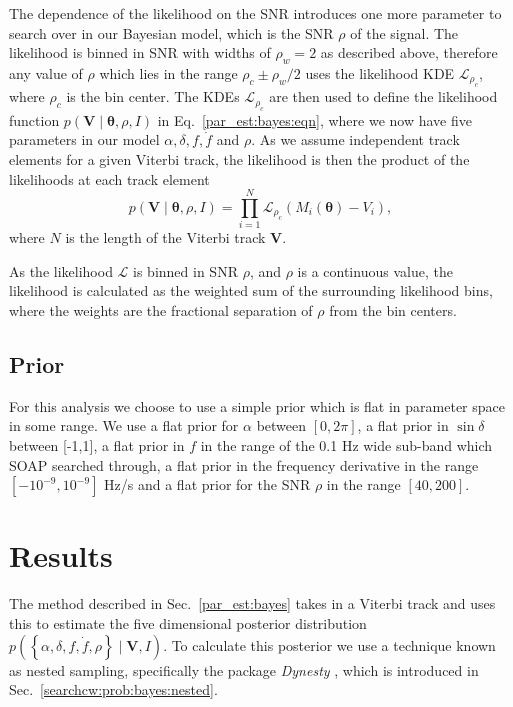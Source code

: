 The dependence of the likelihood on the \gls{SNR} introduces one more parameter to search over in our
Bayesian model, which is the \gls{SNR} $\rho$ of the signal.  The likelihood is binned in \gls{SNR} with widths of $\rho_w = 2$ as described above, therefore any value of $\rho$ which lies in the range $\rho_c \pm \rho_w/2 $ uses the likelihood \gls{KDE} $\mathcal{L}_{\rho_c}$, where $\rho_c$ is the bin center.
The \glspl{KDE} $\mathcal{L}_{\rho_c}$ are then used to define the likelihood function $p(\bm{V} \mid
\bm{\theta}, \rho, I)$ in Eq.~\ref{par_est:bayes:eqn}, where we now have five parameters in our model
$\alpha, \delta, f, \dot{f}$ and $\rho$.  As we assume
independent track elements for a given Viterbi track, the likelihood is then the product of the likelihoods at each track element
%
\begin{equation} 
p(\bm{V} \mid \bm{\theta}, \rho, I) = \prod_{i =
1}^{N} \mathcal{L}_{\rho_c}(M_i(\bm{\theta}) - V_i) , 
\end{equation} 
%
where $N$ is the length of the Viterbi track $\bm{V}$. 

\if
As the likelihood $\mathcal{L}$ is binned in \gls{SNR} $\rho$, and $\rho$ is a
continuous value, the likelihood is calculated as the weighted sum of the
surrounding likelihood bins, where the weights are the fractional separation of
$\rho$ from the bin centers.  
\fi

%
\subsection{Prior}
%
For this analysis we choose to use a simple prior which is flat in parameter space in some range.  We use a flat prior for $\alpha$
between $[0,2\pi]$, a flat prior in $\sin{\delta}$ between [-1,1], a flat prior
in $f$ in the range of the 0.1 Hz wide sub-band which SOAP searched through, a
flat prior in the frequency derivative in the range
$[-10^{-9},10^{-9}]$ Hz/s and a flat prior for the \gls{SNR} $\rho$ in
the range $[40,200]$.


\section{\label{par_est:results}Results}

The method described in Sec.~\ref{par_est:bayes} takes in a Viterbi track and
uses this to estimate the five dimensional posterior distribution
$p\left(\left\{ \alpha, \delta, f, \dot{f}, \rho \right\} \mid \bm{V}, I
\right)$.  To calculate this posterior we use a technique known as nested
sampling, specifically the package {\it Dynesty}
\citep{speagle2019DynestyDynamic}, which is introduced in
Sec.~\ref{searchcw:prob:bayes:nested}.

